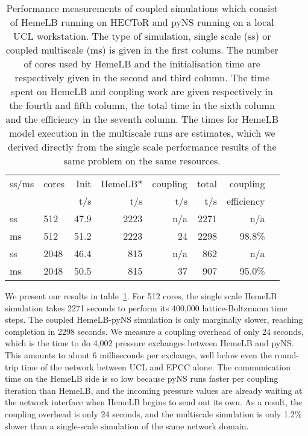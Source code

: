 \documentclass[a4,10pt]{article}
\begin{document}
\begin{table}
    \centering

\begin{tabular}{llrrrrrr}
ss/ms & cores        & Init & HemeLB* & coupling & total & coupling\\
      &              & t/s  & t/s     & t/s      & t/s   & efficiency\\
\hline
ss    & 512          & 47.9 & 2223    & n/a      & 2271  & n/a      \\
ms    & 512          & 51.2 & 2223    & 24       & 2298  & 98.8\%   \\
ss    & 2048         & 46.4 & 815     & n/a      & 862   & n/a      \\
ms    & 2048         & 50.5 & 815     & 37       & 907   & 95.0\%   \\
\end{tabular}
\caption{ Performance measurements of coupled simulations which consist of
HemeLB running on HECToR and pyNS running on a local UCL workstation. The type of
simulation, single scale (ss) or coupled multiscale (ms) is given in the first
colums. The number of cores used by HemeLB and the initialisation time are
respectively given in the second and third column. The time spent on HemeLB and
coupling work are given respectively in the fourth and fifth column, the total
time in the sixth column and the efficiency in the seventh column. The times
for HemeLB model execution in the multiscale runs are estimates, which we derived 
directly from the single scale performance results of the same problem on the 
same resources.
}\label{table:hemelbperf}

\end{table}

We present our results in table~\ref{table:hemelbperf}. For 512 cores, the
single scale HemeLB simulation takes 2271 seconds to perform its 400,000
lattice-Boltzmann time steps. The coupled HemeLB-pyNS simulation is only
marginally slower, reaching completion in 2298 seconds. We measure a coupling
overhead of only 24 seconds, which is the time to do 4,002 pressure exchanges
between HemeLB and pyNS. This amounts to about 6 milliseconds per exchange,
well below even the round-trip time of the network between UCL and EPCC alone.
The communication time on the HemeLB side is so low because pyNS runs faster
per coupling iteration than HemeLB, and the incoming pressure values are
already waiting at the network interface when HemeLB begins to send out its
own. As a result, the coupling overhead is only 24 seconds, and the multiscale
simulation is only 1.2\% slower than a single-scale simulation of the same
network domain.
\end{document}
